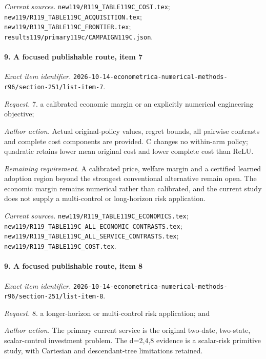 \par\emph{Current sources.} \nolinkurl{new119/R119_TABLE119C_COST.tex}; \nolinkurl{new119/R119_TABLE119C_ACQUISITION.tex}; \nolinkurl{new119/R119_TABLE119C_FRONTIER.tex}; \nolinkurl{results119/primary119c/CAMPAIGN119C.json}.

\paragraph{9. A focused publishable route, item 7}

\emph{Exact item identifier.} \nolinkurl{2026-10-14-econometrica-numerical-methods-r96/section-251/list-item-7}.

\par\emph{Request.} 7. a calibrated economic margin or an explicitly numerical engineering objective;

\par\emph{Author action.} Actual original-policy values, regret bounds, all pairwise contrasts and complete cost components are provided. C changes no within-arm policy; quadratic retains lower mean original cost and lower complete cost than ReLU.

\par\emph{Remaining requirement.} A calibrated price, welfare margin and a certified learned adoption region beyond the strongest conventional alternative remain open. The economic margin remains numerical rather than calibrated, and the current study does not supply a multi-control or long-horizon risk application.

\par\emph{Current sources.} \nolinkurl{new119/R119_TABLE119C_ECONOMICS.tex}; \nolinkurl{new119/R119_TABLE119C_ALL_ECONOMIC_CONTRASTS.tex}; \nolinkurl{new119/R119_TABLE119C_ALL_SERVICE_CONTRASTS.tex}; \nolinkurl{new119/R119_TABLE119C_COST.tex}.

\paragraph{9. A focused publishable route, item 8}

\emph{Exact item identifier.} \nolinkurl{2026-10-14-econometrica-numerical-methods-r96/section-251/list-item-8}.

\par\emph{Request.} 8. a longer-horizon or multi-control risk application; and

\par\emph{Author action.} The primary current service is the original two-date, two-state, scalar-control investment problem. The d=2,4,8 evidence is a scalar-risk primitive study, with Cartesian and descendant-tree limitations retained.

